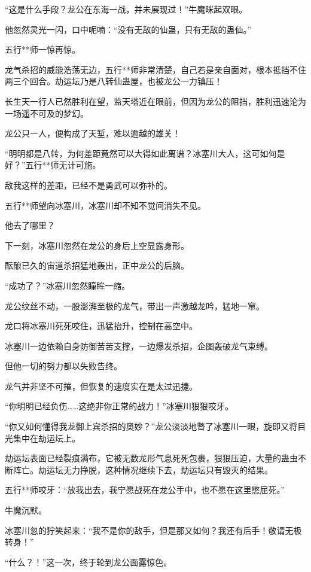 \begin{this_body}
“这是什么手段？龙公在东海一战，并未展现过！”牛魔眯起双眼。

他忽然灵光一闪，口中呢喃：“没有无敌的仙蛊，只有无敌的蛊仙。”

五行**师一惊再惊。

龙气杀招的威能浩荡无边，五行**师非常清楚，自己若是亲自面对，根本抵挡不住两三个回合。劫运坛乃是八转仙蛊屋，也被龙公一力镇压！

长生天一行人已然胜利在望，监天塔近在眼前，但因为龙公的阻挡，胜利迅速沦为一场遥不可及的梦幻。

龙公只一人，便构成了天堑，难以逾越的雄关！

“明明都是八转，为何差距竟然可以大得如此离谱？冰塞川大人，这可如何是好？”五行**师无计可施。

敌我这样的差距，已经不是勇武可以弥补的。

五行**师望向冰塞川，冰塞川却不知不觉间消失不见。

他去了哪里？

下一刻，冰塞川忽然在龙公的身后上空显露身形。

酝酿已久的宙道杀招猛地轰出，正中龙公的后脑。

“成功了？”冰塞川忽然瞳眸一缩。

龙公纹丝不动，一股澎湃至极的龙气，带出一声激越龙吟，猛地一窜。

龙口将冰塞川死死咬住，迅猛抬升，控制在高空中。

冰塞川一边依赖自身防御苦苦支撑，一边爆发杀招，企图轰破龙气束缚。

但他一切的努力都以失败告终。

龙气并非坚不可摧，但恢复的速度实在是太过迅捷。

“你明明已经负伤……这绝非你正常的战力！”冰塞川狠狠咬牙。

“你又如何懂得我龙御上宾杀招的奥妙？”龙公淡淡地瞥了冰塞川一眼，旋即又将目光集中在劫运坛上。

劫运坛表面已经裂痕满布，它被无数龙形气息死死包裹，狠狠压迫，大量的蛊虫不断阵亡。劫运坛无力挣脱，这种情况继续下去，劫运坛只有毁灭的结果。

五行**师咬牙：“放我出去，我宁愿战死在龙公手中，也不愿在这里憋屈死。”

牛魔沉默。

冰塞川忽的狞笑起来：“我不是你的敌手，但是那又如何？我还有后手！敬请无极转身！”

“什么？！”这一次，终于轮到龙公面露惊色。

\end{this_body}


